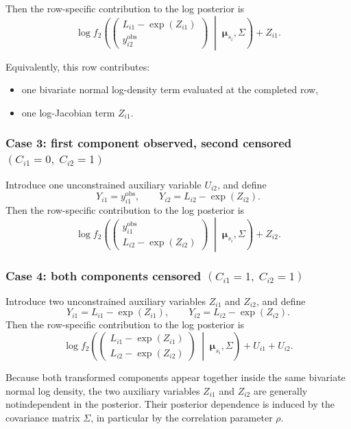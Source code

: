 \documentclass[12pt]{article}
\begin{document}
Then the row-specific contribution to the log posterior is
\[
\log f_2
\left(
\begin{pmatrix}
L_{i1}-\exp(Z_{i1})\\
y_{i2}^{\mathrm{obs}}
\end{pmatrix}
\;\middle|\;
\boldsymbol{\mu}_{s_i},\Sigma
\right)
+
Z_{i1}.
\]

Equivalently, this row contributes:
\begin{itemize}
    \item one bivariate normal log-density term evaluated at the completed row,
    \item one log-Jacobian term \(Z_{i1}\).
\end{itemize}

\subsubsection*{Case 3: first component observed, second censored \((C_{i1}=0,\; C_{i2}=1)\)}

Introduce one unconstrained auxiliary variable \(U_{i2}\), and define
\[
Y_{i1}=y_{i1}^{\mathrm{obs}},\qquad
Y_{i2}=L_{i2}-\exp(Z_{i2}).
\]
Then the row-specific contribution to the log posterior is
\[
\log f_2
\left(
\begin{pmatrix}
y_{i1}^{\mathrm{obs}}\\
L_{i2}-\exp(Z_{i2})
\end{pmatrix}
\;\middle|\;
\boldsymbol{\mu}_{s_i},\Sigma
\right)
+
Z_{i2}.
\]



\subsubsection*{Case 4: both components censored \((C_{i1}=1,\; C_{i2}=1)\)}

Introduce two unconstrained auxiliary variables \(Z_{i1}\) and \(Z_{i2}\), and define
\[
Y_{i1}=L_{i1}-\exp(Z_{i1}),\qquad
Y_{i2}=L_{i2}-\exp(Z_{i2}).
\]
Then the row-specific contribution to the log posterior is
\[
\log f_2
\left(
\begin{pmatrix}
L_{i1}-\exp(Z_{i1})\\
L_{i2}-\exp(Z_{i2})
\end{pmatrix}
\;\middle|\;
\boldsymbol{\mu}_{s_i},\Sigma
\right)
+
U_{i1}+U_{i2}.
\]

Because both transformed components appear together inside the same bivariate normal log density, the two auxiliary variables \(Z_{i1}\) and \(Z_{i2}\) are generally notindependent in the posterior.  
Their posterior dependence is induced by the covariance matrix \(\Sigma\), in particular by the correlation parameter \(\rho\).
\end{document}
